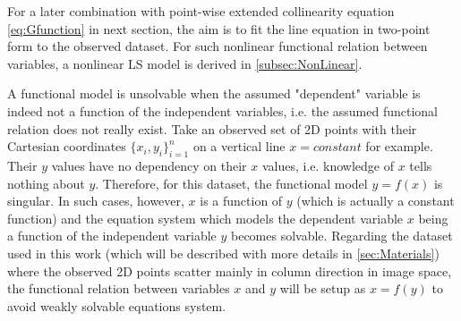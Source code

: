 For a later combination with point-wise extended collinearity equation \eqref{eq:Gfunction} in next section, the aim is to fit the line equation in two-point form to the observed dataset. For such nonlinear functional relation between variables, a nonlinear LS model is derived in \cref{subsec:NonLinear}.

A functional model is unsolvable when the assumed "dependent" variable is indeed not a function of the independent variables, i.e. the assumed functional relation does not really exist. Take an observed set of 2D points with their Cartesian coordinates $\{x_i,y_i\}^n_{i=1}$ on a vertical line $x=constant$ for example. Their $y$ values have no dependency on their $x$ values, i.e. knowledge of $x$ tells nothing about $y$. Therefore, for this dataset, the functional model $y=f(x)$ is singular. In such cases, however, $x$ is a function of $y$ (which is actually a constant function) and the equation system which models the dependent variable $x$ being a function of the independent variable $y$ becomes solvable. Regarding the dataset used in this work (which will be described with more details in \cref{sec:Materials}) where the observed 2D points scatter mainly in column direction in image space, the functional relation between variables $x$ and $y$ will be setup as $x=f(y)$ to avoid weakly solvable equations system.





